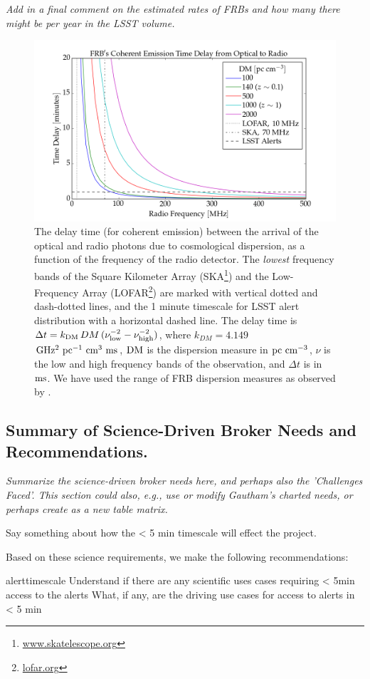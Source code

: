 {\it Add in a final comment on the estimated rates of FRBs and how many there might be per year in the LSST volume.}

\begin{figure}[h]
\begin{center}
\includegraphics[width=12cm]{figures/frb_optical_delays.png}
\caption{The delay time (for coherent emission) between the arrival of the optical and radio photons due to cosmological dispersion, as a function of the frequency of the radio detector. The {\it lowest} frequency bands of the Square Kilometer Array (SKA\footnote{\url{www.skatelescope.org}}) and the Low-Frequency Array (LOFAR\footnote{\url{lofar.org}}) are marked with vertical dotted and dash-dotted lines, and the 1 minute timescale for LSST alert distribution with a horizontal dashed line. The delay time is $\Delta t = k_{\rm DM}\,DM\,(\nu_{\rm low}^{-2} - \nu_{\rm high}^{-2})$, where $k_{DM}=4.149$ $\rm GHz^2\ pc^{-1}\ cm^3\ ms$, ${\rm DM}$ is the dispersion measure in $\rm pc\ cm^{-3}$, $\nu$ is the low and high frequency bands of the observation, and $\Delta t$ is in $\rm ms$. We have used the range of FRB dispersion measures as observed by \cite{2018Natur.562..386S}. \label{fig:sci_frb}}
\end{center}
\end{figure}


\subsection{Summary of Science-Driven Broker Needs and Recommendations.}\label{ssec:sci_sum}

{\it Summarize the science-driven broker needs here, and perhaps also the 'Challenges Faced'. This section could also, e.g., use or modify Gautham's charted needs, or perhaps create as a new table matrix.}

Say something about how the < 5 min timescale will effect the project. 

Based on these science requirements, we make the following recommendations: 

\nrec
{alerttimescale}
{Understand if there are any scientific uses cases requiring < 5min access to the alerts}
{What, if any, are the driving use cases for access to alerts in < 5 min}

